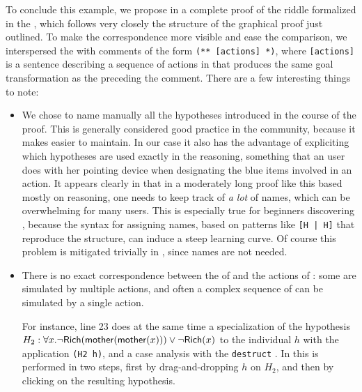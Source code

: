 To conclude this example, we propose in  a complete proof of
the riddle formalized in the  , which follows very closely the
structure of the graphical proof just outlined. To make the correspondence more
visible and ease the comparison, we interspersed the  with comments
of the form \texttt{(** [actions] *)}, where \texttt{[actions]} is a
sentence describing a sequence of actions in  that produces the same goal
transformation as the  preceding the comment. There are a few interesting
things to note:
\begin{itemize}
  \item We chose to name manually all the hypotheses introduced in the course of
  the proof. This is generally considered good practice in the  community,
  because it makes  easier to maintain. In our case it also has the
  advantage of expliciting which hypotheses are used exactly in the reasoning,
  something that an  user does with her pointing device when designating
  the blue items involved in an action. It appears clearly in
   that in a moderately long proof like this based mostly on
   reasoning, one needs to keep track of \emph{a lot} of names, which can
  be overwhelming for many users. This is especially true for beginners
  discovering , because the syntax for assigning names, based on patterns
  like \texttt{[H | H]} that reproduce the  structure, can induce a steep
  learning curve. Of course this problem is mitigated trivially in , since
  names are not needed.

  \item There is no exact correspondence between the  of  and the
  actions of : some  are simulated by multiple actions, and often a
  complex sequence of  can be simulated by a single action.
  
  For instance, line 23 does at the same time a specialization of the hypothesis
  $H_2 : \forall x. \neg \mbox{\textsf{Rich}}(\mbox{\textsf{mother}}(\mbox{\textsf{mother}}(x))) \lor \neg \mbox{\textsf{Rich}}(x)$ to the
  individual $h$ with the application \texttt{(H2 h)}, and a case analysis with
  the \texttt{destruct} . In  this is performed in two steps, first
  by drag-and-dropping $h$ on $H_2$, and then by clicking on the resulting
  hypothesis.


\end{itemize}

